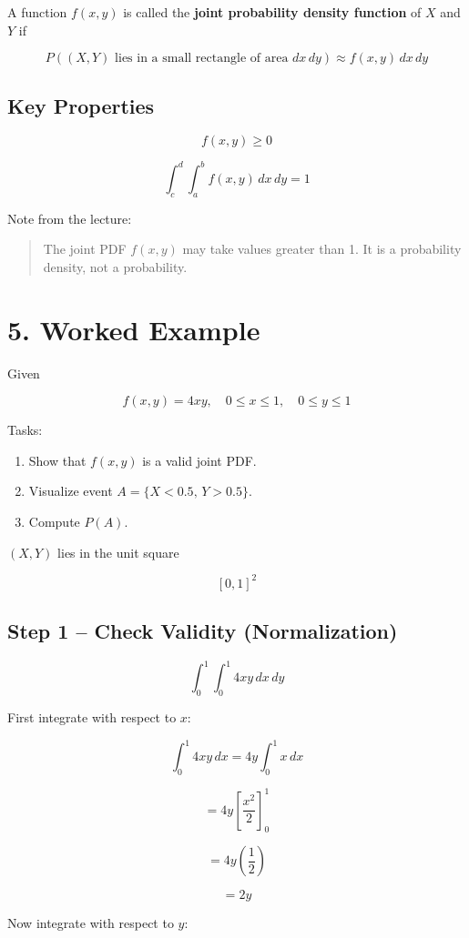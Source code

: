 \documentclass[12pt]{article}
\begin{document}
A function $f(x,y)$ is called the \textbf{joint probability density function} of $X$ and $Y$ if

\[
P((X,Y)\text{ lies in a small rectangle of area } dx\,dy) \approx f(x,y)\,dx\,dy
\]

\subsection*{Key Properties}

\[
f(x,y) \ge 0
\]

\[
\int_c^d \int_a^b f(x,y)\,dx\,dy = 1
\]

Note from the lecture:

\begin{quote}
The joint PDF $f(x,y)$ may take values greater than 1. It is a probability density, not a probability.
\end{quote}

\section*{5. Worked Example}

Given

\[
f(x,y)=4xy, \quad 0 \le x \le 1,\quad 0 \le y \le 1
\]

Tasks:

\begin{enumerate}
\item Show that $f(x,y)$ is a valid joint PDF.
\item Visualize event $A=\{X<0.5,\,Y>0.5\}$.
\item Compute $P(A)$.
\end{enumerate}

$(X,Y)$ lies in the unit square

\[
[0,1]^2
\]

\subsection*{Step 1 -- Check Validity (Normalization)}

\[
\int_0^1 \int_0^1 4xy\,dx\,dy
\]

First integrate with respect to $x$:

\[
\int_0^1 4xy\,dx = 4y \int_0^1 x\,dx
\]

\[
=4y \left[\frac{x^2}{2}\right]_0^1
\]

\[
=4y\left(\frac{1}{2}\right)
\]

\[
=2y
\]

Now integrate with respect to $y$:
\end{document}

